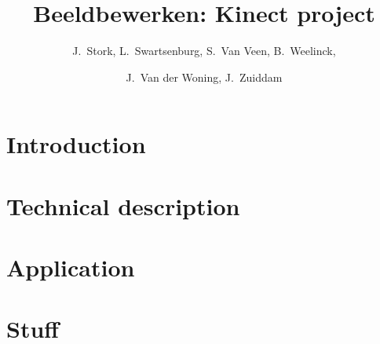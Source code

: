 \documentclass{scrreprt}
\title{
  Beeldbewerken: Kinect project
}
\author{
  J.\ Stork, L.\ Swartsenburg,  S.\ Van Veen, B.\ Weelinck,\and J.\ Van der Woning, J.\ Zuiddam 
} %
\begin{document}
\maketitle
\tableofcontents


\chapter{Introduction}\label{ch:introduction}
    


\chapter{Technical description}
\label{ch:technical}
    


\chapter{Application} 
\label{ch:application}
    


\appendix

\chapter{Stuff} 
\label{ch:appendixA}
\end{document}
